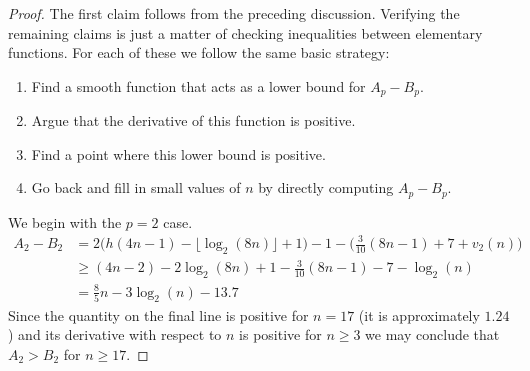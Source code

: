 \begin{proof}
  The first claim follows from the preceding discussion.
  Verifying the remaining claims is just a matter of checking inequalities between elementary functions.
  For each of these we follow the same basic strategy:
  \begin{enumerate}
  \item Find a smooth function that acts as a lower bound for $A_p - B_p$.
  \item Argue that the derivative of this function is positive.
  \item Find a point where this lower bound is positive.
  \item Go back and fill in small values of $n$ by directly computing $A_p - B_p$.
  \end{enumerate}
  
  We begin with the $p=2$ case.
  \begin{align*}
    A_2 - B_2
    &= 2 \bigg(h(4n-1) - \lfloor \log_2(8n) \rfloor + 1 \bigg) - 1 - \bigg( \frac{3}{10}(8n-1) + 7 + v_2(n) \bigg) \\
    &\geq (4n - 2) - 2\log_2(8n)  + 1 - \frac{3}{10}(8n-1) - 7 - \log_2(n) \\
    &= \frac{8}{5}n - 3\log_2(n)  - 13.7
  \end{align*}
  Since the quantity on the final line is positive for $n=17$ (it is approximately $1.24$) and its derivative with respect to $n$ is positive for $n \geq 3$ we may conclude that $A_2>B_2$ for $n \geq 17$.


\end{proof}
